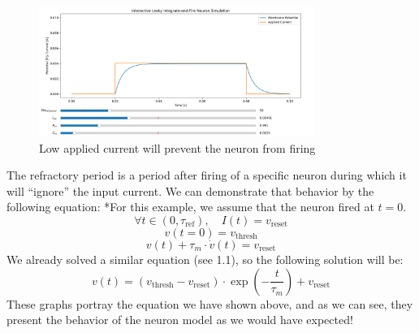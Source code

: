 \begin{figure}[H]
    \centering
    \includegraphics[width=0.8\textwidth]{methods/computational-models/graphs/LIF-heaviside-low-input.png}
    \caption{Low applied current will prevent the neuron from firing}
    \label{fig:LIF-heaviside-low-input}
\end{figure}

The refractory period is a period after firing of a specific neuron during which it will ``ignore'' the input current. We can demonstrate that behavior by the following equation:
*For this example, we assume that the neuron fired at \( t=0 \).
\begin{equation}
\forall t \in (0,\tau_{\text{ref}}), \quad I(t) = v_{\text{reset}}
\end{equation}
\begin{equation}
v(t=0) = v_{\text{thresh}}
\end{equation}
\begin{equation}
v(t) + \tau_m \cdot \dot{v}(t) = v_{\text{reset}}
\end{equation}
We already solved a similar equation (see 1.1), so the following solution will be:
\begin{equation}
v(t) = (v_{\text{thresh}} - v_{\text{reset}}) \cdot \exp\left(-\frac{t}{\tau_m}\right) + v_{\text{reset}}
\end{equation}
These graphs portray the equation we have shown above, and as we can see, they present the behavior of the neuron model as we would have expected!

